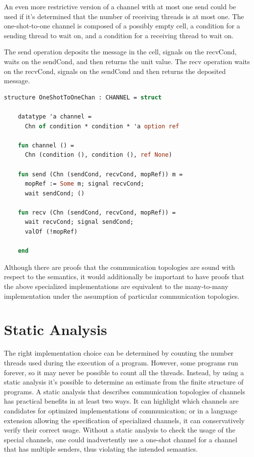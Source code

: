 \documentclass{article}
\begin{document}
An even more restrictive version of a channel with at most one send could be used if it's
determined that the number of receiving threads is at most one.  The one-shot-to-one channel is
composed of a possibly empty cell, a condition for a sending thread to wait on, and a condition
for a receiving thread to wait on.

The send operation deposits the message in the cell, signals on the recvCond, waits on the
sendCond, and then returns the unit value.  The recv operation waits on the recvCond, signals
on the sendCond and then returns the deposited message.


\begin{lstlisting}[language=ML, escapechar=\%]
  structure OneShotToOneChan : CHANNEL = struct

    datatype 'a channel =
      Chn of condition * condition * 'a option ref

    fun channel () =
      Chn (condition (), condition (), ref None)

    fun send (Chn (sendCond, recvCond, mopRef)) m =
      mopRef := Some m; signal recvCond;  
      wait sendCond; ()

    fun recv (Chn (sendCond, recvCond, mopRef)) =
      wait recvCond; signal sendCond;
      valOf (!mopRef)

    end
  \end{lstlisting}


Although there are proofs that the communication topologies are sound with respect to the
semantics, it would additionally be important to have proofs that the above specialized
implementations are equivalent to the many-to-many implementation under the assumption of
particular communication topologies.

\section{Static Analysis}
The right implementation choice can be determined by counting the number threads used during
the execution of a program. However, some programs run forever, so it may never be possible to
count all the threads. Instead, by using a static analysis it's possible to determine an
estimate from the finite structure of programs. A static analysis that describes communication
topologies of channels has practical benefits in at least two ways.  It can highlight which
channels are candidates for optimized implementations of communication; or in a language
extension allowing the specification of specialized channels, it can conservatively verify
their correct usage. Without a static analysis to check the usage of the special channels, one
could inadvertently use a one-shot channel for a channel that has multiple senders, thus
violating the intended semantics. 
\end{document}

